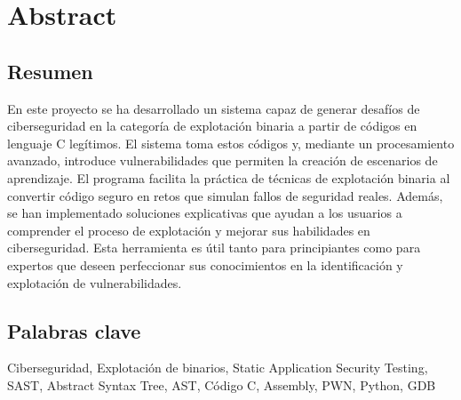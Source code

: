 \chapter*{Abstract}
\section*{Resumen}
En este proyecto se ha desarrollado un sistema capaz de generar desafíos de ciberseguridad en la categoría de explotación binaria a partir de códigos en lenguaje C legítimos.
El sistema toma estos códigos y, mediante un procesamiento avanzado, introduce vulnerabilidades que permiten la creación de escenarios de aprendizaje.
El programa facilita la práctica de técnicas de explotación binaria al convertir código seguro en retos que simulan fallos de seguridad reales.
Además, se han implementado soluciones explicativas que ayudan a los usuarios a comprender el proceso de explotación y mejorar sus habilidades en ciberseguridad.
Esta herramienta es útil tanto para principiantes como para expertos que deseen perfeccionar sus conocimientos en la identificación y explotación de vulnerabilidades.

\section*{Palabras clave}
Ciberseguridad, Explotación de binarios, Static Application Security Testing, SAST, Abstract Syntax Tree, AST, Código C, Assembly, PWN, Python, GDB